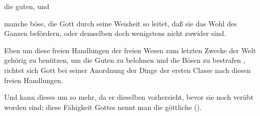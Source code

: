 \begin{aufza}
\begin{aufzb}
\item die guten, und
\item manche böse, die Gott durch seine Weisheit so leitet, daß sie das Wohl des Ganzen befördern, oder demselben doch wenigstens nicht zuwider sind.
\end{aufzb}
\item Eben um diese freien Handlungen der freien Wesen zum letzten Zwecke der Welt gehörig zu benützen, um die Guten zu belohnen und die Bösen zu bestrafen \usw , richtet sich Gott bei seiner Anordnung der Dinge der ersten Classe nach diesen freien Handlungen.~
\item Und kann dieses um so mehr, da er dieselben vorhersieht, bevor sie noch verübt worden sind; diese Fähigkeit Gottes nennt man die göttliche  ().
\end{aufza}


